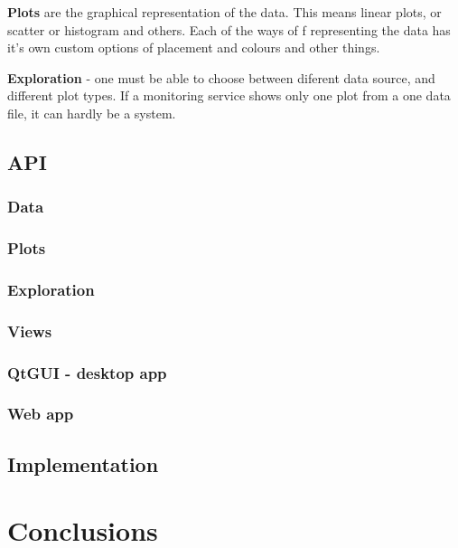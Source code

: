 \textbf{Plots} are the graphical representation of the data. This means linear plots, or scatter or histogram and others. Each of the ways of f representing the data has it's own custom options of placement and colours and other things.

\textbf{Exploration} - one must be able to choose between diferent data source, and different plot types. If a monitoring service shows only one plot from a one data file, it can hardly be a system.


\subsection{API}
\subsubsection{Data}
\subsubsection{Plots}
\subsubsection{Exploration}
\subsubsection{Views}
\subsubsection{QtGUI - desktop app}
\subsubsection{Web app}
\subsection{Implementation}

\section{Conclusions}



